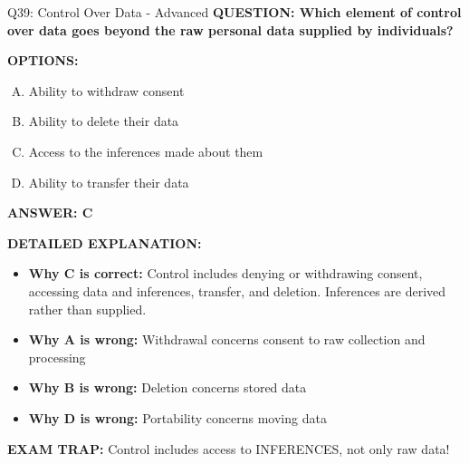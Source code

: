\documentclass[8pt]{beamer}
\begin{document}
\begin{frame}[shrink=6]{Q39: Control Over Data - Advanced}
\fontsize{6.5}{7.5}\selectfont
\textbf{QUESTION: Which element of control over data goes beyond the raw personal data supplied by individuals?}

\vspace{0.1cm}
\textbf{OPTIONS:}
\begin{enumerate}[A.]
\item Ability to withdraw consent
\item Ability to delete their data
\item Access to the inferences made about them
\item Ability to transfer their data
\end{enumerate}

\vspace{0.1cm}
\textcolor{myblue}{\textbf{ANSWER: C}}

\vspace{0.1cm}
\textbf{DETAILED EXPLANATION:}
\begin{itemize}
\item \textbf{Why C is correct:} Control includes denying or withdrawing consent, accessing data and inferences, transfer, and deletion. Inferences are derived rather than supplied.
\item \textbf{Why A is wrong:} Withdrawal concerns consent to raw collection and processing
\item \textbf{Why B is wrong:} Deletion concerns stored data
\item \textbf{Why D is wrong:} Portability concerns moving data
\end{itemize}

\textcolor{myred}{\textbf{EXAM TRAP:}} Control includes access to INFERENCES, not only raw data!
\end{frame}

\end{document}
